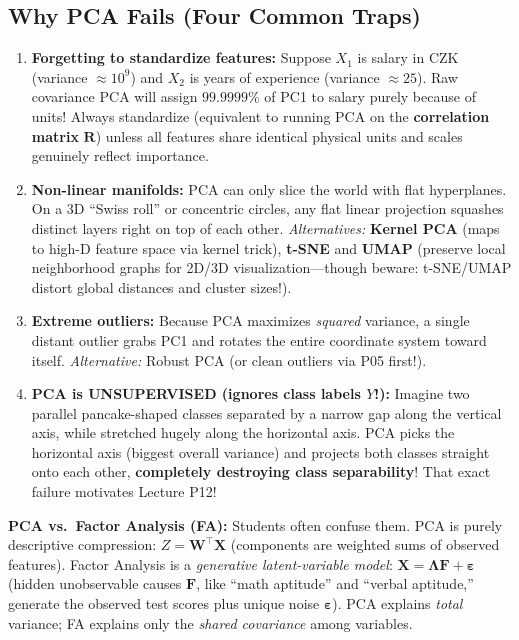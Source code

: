 \documentclass[11pt, a4paper]{article}
\begin{document}
\subsection{Why PCA Fails (Four Common Traps)}
\begin{enumerate}
    \item \textbf{Forgetting to standardize features:} Suppose $X_1$ is salary in CZK (variance $\approx 10^9$) and $X_2$ is years of experience (variance $\approx 25$). Raw covariance PCA will assign $99.9999\%$ of PC1 to salary purely because of units! Always standardize (equivalent to running PCA on the \textbf{correlation matrix} $\mathbf{R}$) unless all features share identical physical units and scales genuinely reflect importance.
    \item \textbf{Non-linear manifolds:} PCA can only slice the world with flat hyperplanes. On a 3D ``Swiss roll'' or concentric circles, any flat linear projection squashes distinct layers right on top of each other. \emph{Alternatives:} \textbf{Kernel PCA} (maps to high-D feature space via kernel trick), \textbf{t-SNE} and \textbf{UMAP} (preserve local neighborhood graphs for 2D/3D visualization---though beware: t-SNE/UMAP distort global distances and cluster sizes!).
    \item \textbf{Extreme outliers:} Because PCA maximizes \emph{squared} variance, a single distant outlier grabs PC1 and rotates the entire coordinate system toward itself. \emph{Alternative:} Robust PCA (or clean outliers via P05 first!).
    \item \textbf{PCA is UNSUPERVISED (ignores class labels $Y$!):} Imagine two parallel pancake-shaped classes separated by a narrow gap along the vertical axis, while stretched hugely along the horizontal axis. PCA picks the horizontal axis (biggest overall variance) and projects both classes straight onto each other, \textbf{completely destroying class separability}! That exact failure motivates Lecture P12!
\end{enumerate}

\textbf{PCA vs.\ Factor Analysis (FA):} Students often confuse them. PCA is purely descriptive compression: $Z = \mathbf{W}^\top \mathbf{X}$ (components are weighted sums of observed features). Factor Analysis is a \emph{generative latent-variable model}: $\mathbf{X} = \boldsymbol{\Lambda}\mathbf{F} + \boldsymbol{\varepsilon}$ (hidden unobservable causes $\mathbf{F}$, like ``math aptitude'' and ``verbal aptitude,'' generate the observed test scores plus unique noise $\boldsymbol{\varepsilon}$). PCA explains \emph{total} variance; FA explains only the \emph{shared covariance} among variables.
\end{document}
